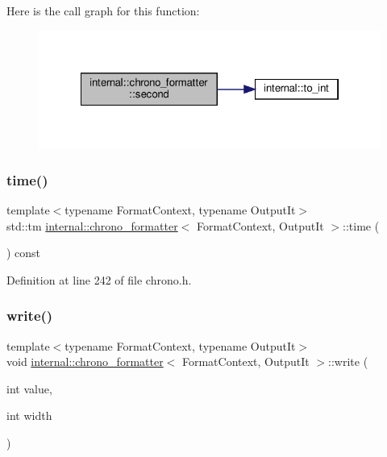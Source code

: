 Here is the call graph for this function\+:
\nopagebreak
\begin{figure}[H]
\begin{center}
\leavevmode
\includegraphics[width=322pt]{structinternal_1_1chrono__formatter_ab026333785c1f7bb169ba5d59ca90e34_cgraph}
\end{center}
\end{figure}
\mbox{\label{structinternal_1_1chrono__formatter_aa3b7815dd885ba3a84aa304a34f25079}} 
\subsubsection{\texorpdfstring{time()}{time()}}
{\footnotesize\ttfamily template$<$typename Format\+Context, typename Output\+It$>$ \\
std\+::tm \hyperlink{structinternal_1_1chrono__formatter}{internal\+::chrono\+\_\+formatter}$<$ Format\+Context, Output\+It $>$\+::time (\begin{DoxyParamCaption}{ }\end{DoxyParamCaption}) const\hspace{0.3cm}{\ttfamily [inline]}}



Definition at line 242 of file chrono.\+h.

\mbox{\label{structinternal_1_1chrono__formatter_a868a76a4e13f979b43fba28c249959b5}} 
\subsubsection{\texorpdfstring{write()}{write()}}
{\footnotesize\ttfamily template$<$typename Format\+Context, typename Output\+It$>$ \\
void \hyperlink{structinternal_1_1chrono__formatter}{internal\+::chrono\+\_\+formatter}$<$ Format\+Context, Output\+It $>$\+::write (\begin{DoxyParamCaption}\item[{int}]{value,  }\item[{int}]{width }\end{DoxyParamCaption})\hspace{0.3cm}{\ttfamily [inline]}}



